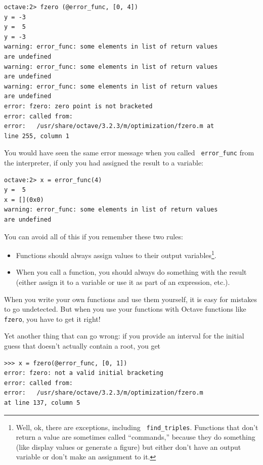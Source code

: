 \documentclass{book}
\begin{document}
\begin{verbatim}
octave:2> fzero (@error_func, [0, 4])
y = -3
y =  5
y = -3
warning: error_func: some elements in list of return values 
are undefined
warning: error_func: some elements in list of return values 
are undefined
warning: error_func: some elements in list of return values 
are undefined
error: fzero: zero point is not bracketed
error: called from:
error:   /usr/share/octave/3.2.3/m/optimization/fzero.m at 
line 255, column 1
\end{verbatim}

You would have seen the same error message when you called {\tt
error\_func} from the interpreter, if only you had assigned the result
to a variable:

\begin{verbatim}
octave:2> x = error_func(4)
y =  5
x = [](0x0)
warning: error_func: some elements in list of return values 
are undefined
\end{verbatim}

You can avoid all of this if you remember these two rules:

\begin{itemize}

\item Functions should always assign values to their output
variables\footnote{Well, ok, there are exceptions, including {\tt
find\_triples}. Functions that don't return a value are sometimes
called ``commands,'' because they do something (like display values or
generate a figure) but either don't have an output variable or don't
make an assignment to it.}.

\item When you call a function, you should always do something with
the result (either assign it to a variable or use it as part of an
expression, etc.).

\end{itemize}

When you write your own functions and use them yourself, it is easy
for mistakes to go undetected. But when you use your functions with
Octave functions like {\tt fzero}, you have to get it right!

Yet another thing that can go wrong: if you provide an interval for the
initial guess that doesn't actually contain a root, you get

\begin{verbatim}
>>> x = fzero(@error_func, [0, 1])
error: fzero: not a valid initial bracketing
error: called from:
error:   /usr/share/octave/3.2.3/m/optimization/fzero.m 
at line 137, column 5
\end{verbatim}
\end{document}
